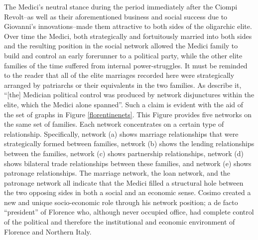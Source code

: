 The Medici's neutral stance during the period immediately after the Ciompi Revolt--as well as their aforementioned business and social success due to Giovanni's innovations--made them attractive to both sides of the oligarchic elite. Over time the Medici, both strategically and fortuitously married into both sides and the resulting position in the social network allowed the Medici family to build and control an early forerunner to a political party, while the other elite families of the time suffered from internal power-struggles. It must be reminded to the reader that all of the elite marriages recorded here were strategically arranged by patriarchs or their equivalents in the two families. As \citet[p.~1259]{Padgett1993} describe it, ``[the] Medician political control was produced by network disjunctures within the elite, which the Medici alone spanned''. Such a claim is evident with the aid of the set of graphs in Figure \ref{florentinenets}. This Figure provides five networks on the same set of families. Each network concentrates on a certain type of relationship. Specifically, network (a) shows marriage relationships that were strategically formed between families, network (b) shows the lending relationships between the families, network (c) shows partnership relationships, network (d) shows bilateral trade relationships between these families, and network (e) shows patronage relationships. The marriage network, the loan network, and the patronage network all indicate that the Medici filled a structural hole between the two opposing sides in both a social and an economic sense. Cosimo created a new and unique socio-economic role through his network position; a de facto ``president'' of Florence who, although never occupied office, had complete control of the political and therefore the institutional and economic environment of Florence and Northern Italy.

